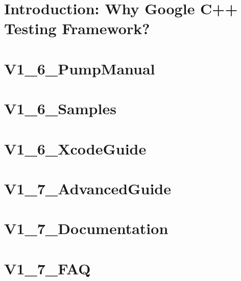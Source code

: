 \documentclass[twoside]{book}
\newcommand{\+}{\discretionary{\mbox{\scriptsize$\hookleftarrow$}}{}{}}
\begin{document}
\chapter{Introduction\+: Why Google C++ Testing Framework?}
\label{md_vendor_googletest_googletest_docs_V1_6_Primer}

\chapter{V1\+\_\+6\+\_\+\+Pump\+Manual}
\label{md_vendor_googletest_googletest_docs_V1_6_PumpManual}

\chapter{V1\+\_\+6\+\_\+\+Samples}
\label{md_vendor_googletest_googletest_docs_V1_6_Samples}

\chapter{V1\+\_\+6\+\_\+\+Xcode\+Guide}
\label{md_vendor_googletest_googletest_docs_V1_6_XcodeGuide}

\chapter{V1\+\_\+7\+\_\+\+Advanced\+Guide}
\label{md_vendor_googletest_googletest_docs_V1_7_AdvancedGuide}

\chapter{V1\+\_\+7\+\_\+\+Documentation}
\label{md_vendor_googletest_googletest_docs_V1_7_Documentation}

\chapter{V1\+\_\+7\+\_\+\+FAQ}
\label{md_vendor_googletest_googletest_docs_V1_7_FAQ}

\end{document}
